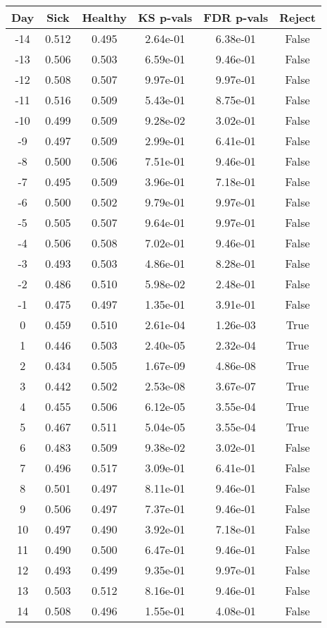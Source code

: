 \begin{tabular}{c|c|c|c|c|c}
Day &  Sick & Healthy &  KS p-vals & FDR p-vals & Reject\\
\hline
-14 & 0.512 &   0.495 &   2.64e-01 &   6.38e-01 &  False\\
-13 & 0.506 &   0.503 &   6.59e-01 &   9.46e-01 &  False\\
-12 & 0.508 &   0.507 &   9.97e-01 &   9.97e-01 &  False\\
-11 & 0.516 &   0.509 &   5.43e-01 &   8.75e-01 &  False\\
-10 & 0.499 &   0.509 &   9.28e-02 &   3.02e-01 &  False\\
 -9 & 0.497 &   0.509 &   2.99e-01 &   6.41e-01 &  False\\
 -8 & 0.500 &   0.506 &   7.51e-01 &   9.46e-01 &  False\\
 -7 & 0.495 &   0.509 &   3.96e-01 &   7.18e-01 &  False\\
 -6 & 0.500 &   0.502 &   9.79e-01 &   9.97e-01 &  False\\
 -5 & 0.505 &   0.507 &   9.64e-01 &   9.97e-01 &  False\\
 -4 & 0.506 &   0.508 &   7.02e-01 &   9.46e-01 &  False\\
 -3 & 0.493 &   0.503 &   4.86e-01 &   8.28e-01 &  False\\
 -2 & 0.486 &   0.510 &   5.98e-02 &   2.48e-01 &  False\\
 -1 & 0.475 &   0.497 &   1.35e-01 &   3.91e-01 &  False\\
  0 & 0.459 &   0.510 &   2.61e-04 &   1.26e-03 &   True\\
  1 & 0.446 &   0.503 &   2.40e-05 &   2.32e-04 &   True\\
  2 & 0.434 &   0.505 &   1.67e-09 &   4.86e-08 &   True\\
  3 & 0.442 &   0.502 &   2.53e-08 &   3.67e-07 &   True\\
  4 & 0.455 &   0.506 &   6.12e-05 &   3.55e-04 &   True\\
  5 & 0.467 &   0.511 &   5.04e-05 &   3.55e-04 &   True\\
  6 & 0.483 &   0.509 &   9.38e-02 &   3.02e-01 &  False\\
  7 & 0.496 &   0.517 &   3.09e-01 &   6.41e-01 &  False\\
  8 & 0.501 &   0.497 &   8.11e-01 &   9.46e-01 &  False\\
  9 & 0.506 &   0.497 &   7.37e-01 &   9.46e-01 &  False\\
 10 & 0.497 &   0.490 &   3.92e-01 &   7.18e-01 &  False\\
 11 & 0.490 &   0.500 &   6.47e-01 &   9.46e-01 &  False\\
 12 & 0.493 &   0.499 &   9.35e-01 &   9.97e-01 &  False\\
 13 & 0.503 &   0.512 &   8.16e-01 &   9.46e-01 &  False\\
 14 & 0.508 &   0.496 &   1.55e-01 &   4.08e-01 &  False\\
\end{tabular}